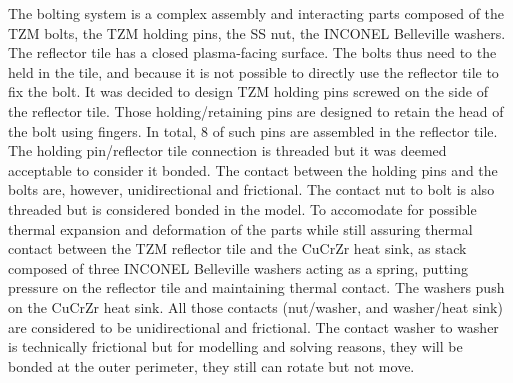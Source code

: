 \normalsize{\indent The bolting system is a complex assembly and interacting parts composed of the \acrshort{TZM} bolts, the \acrshort{TZM} holding pins, the \acrshort{SS} nut, the INCONEL Belleville washers. The reflector tile has a closed plasma-facing surface. The bolts thus need to the held in the tile, and because it is not possible to directly use the reflector tile to fix the bolt. It was decided to design \acrshort{TZM} holding pins screwed on the side of the reflector tile. Those holding/retaining pins are designed to retain the head of the bolt using fingers. In total, 8 of such pins are assembled in the reflector tile. The holding pin/reflector tile connection is threaded but it was deemed acceptable to consider it bonded. The contact between the holding pins and the bolts are, however, unidirectional and frictional. The contact nut to bolt is also threaded but is considered bonded in the model. To accomodate for possible thermal expansion and deformation of the parts while still assuring thermal contact between the \acrshort{TZM} reflector tile and the \acrshort{CuCrZr} heat sink, as stack composed of three INCONEL Belleville washers acting as a spring, putting pressure on the reflector tile and maintaining thermal contact. The washers push on the \acrshort{CuCrZr} heat sink. All those contacts (nut/washer, and washer/heat sink) are considered to be unidirectional and frictional. The contact washer to washer is technically frictional but for modelling and solving reasons, they will be bonded at the outer perimeter, they still can rotate but not move.}

